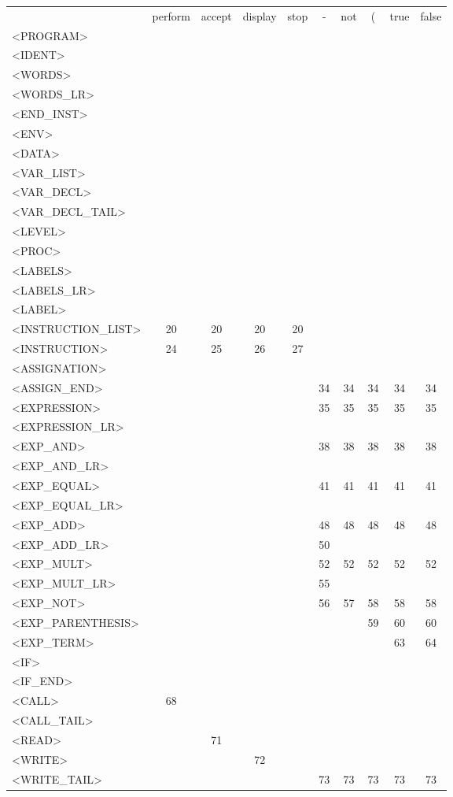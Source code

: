 \documentclass[a4paper,11pt]{article}
\begin{document}
\begin{longtable}{l||ccccccccc}
	& perform & accept & display & stop & - & not & ( & true & false\\
	<PROGRAM> & & & & & & & & & \\
	<IDENT>& & & & & & & & & \\
	<WORDS> & & & & & & & & & \\
	<WORDS\_LR> & & & & & & & & & \\
	<END\_INST>& & & & & & & & & \\
	<ENV>& & & & & & & & & \\
	<DATA> & & & & & & & & & \\
	<VAR\_LIST>& & & & & & & & & \\
	<VAR\_DECL> & & & & & & & & & \\
	<VAR\_DECL\_TAIL>& & & & & & & & & \\
	<LEVEL>& & & & & & & & & \\
	<PROC>& & & & & & & & & \\
	<LABELS>& & & & & & & & & \\
	<LABELS\_LR> & & & & & & & & & \\
	<LABEL> & & & & & & & & & \\
	<INSTRUCTION\_LIST>& 20 & 20 & 20 & 20 & & & & & \\
	<INSTRUCTION>& 24 & 25 & 26 & 27 & & & & & \\
	<ASSIGNATION>& & & & & & & & & \\
	<ASSIGN\_END>& & & & & 34 & 34 & 34 & 34 & 34 \\
	<EXPRESSION> & & & & & 35 & 35 & 35 & 35 & 35 \\
	<EXPRESSION\_LR>& & & & & & & & & \\
	<EXP\_AND> & & & & & 38 & 38 & 38 & 38 & 38 \\
	<EXP\_AND\_LR>& & & & & & & & & \\
	<EXP\_EQUAL> & & & & & 41 & 41 & 41 & 41 & 41 \\
	<EXP\_EQUAL\_LR>& & & & & & & & & \\
	<EXP\_ADD> & & & & & 48 & 48 & 48 & 48 & 48 \\
	<EXP\_ADD\_LR>& & & & & 50 & & & & \\
	<EXP\_MULT> & & & & & 52 & 52 & 52 & 52 & 52 \\
	<EXP\_MULT\_LR>& & & & & 55 & & & & \\
	<EXP\_NOT> & & & & & 56 & 57 & 58 & 58 & 58 \\
	<EXP\_PARENTHESIS> & & & & & & & 59 & 60 & 60 \\
	<EXP\_TERM> & & & & & & & & 63 & 64 \\
	<IF> & & & & & & & & & \\
	<IF\_END> & & & & & & & & & \\
	<CALL> & 68 & & & & & & & & \\
	<CALL\_TAIL>& & & & & & & & & \\
	<READ> & & 71 & & & & & & & \\
	<WRITE>& & & 72 & & & & & & \\
	<WRITE\_TAIL> & & & & & 73 & 73 & 73 & 73 & 73 \\
\end{longtable}
\end{document}
